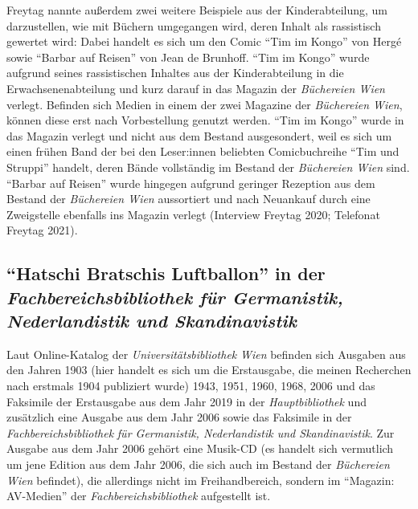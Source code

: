\documentclass[a4paper,
fontsize=11pt,
oneside,
numbers=noperiodatend,
parskip=half-,
bibliography=totoc,
final
]{scrartcl}
\begin{document}
Freytag nannte außerdem zwei weitere Beispiele aus der Kinderabteilung,
um darzustellen, wie mit Büchern umgegangen wird, deren Inhalt als
rassistisch gewertet wird: Dabei handelt es sich um den Comic \enquote{Tim im
Kongo} von Hergé sowie \enquote{Barbar auf Reisen} von Jean de Brunhoff.
\enquote{Tim im Kongo} wurde aufgrund seines rassistischen Inhaltes aus der
Kinderabteilung in die Erwachsenenabteilung und kurz darauf in das
Magazin der \emph{Büchereien Wien} verlegt. Befinden sich Medien in
einem der zwei Magazine der \emph{Büchereien Wien}, können diese erst
nach Vorbestellung genutzt werden. \enquote{Tim im Kongo} wurde in das Magazin
verlegt und nicht aus dem Bestand ausgesondert, weil es sich um einen
frühen Band der bei den Leser:innen beliebten Comicbuchreihe \enquote{Tim und
Struppi} handelt, deren Bände vollständig im Bestand der
\emph{Büchereien Wien} sind. \enquote{Barbar auf Reisen} wurde hingegen
aufgrund geringer Rezeption aus dem Bestand der \emph{Büchereien Wien}
aussortiert und nach Neuankauf durch eine Zweigstelle ebenfalls ins
Magazin verlegt (Interview Freytag 2020; Telefonat Freytag 2021).

\hypertarget{hatschi-bratschis-luftballon-in-der-fachbereichsbibliothek-fuxfcr-germanistik-nederlandistik-und-skandinavistik}{%
\subsection{\texorpdfstring{\enquote{Hatschi Bratschis Luftballon} in der
\emph{Fachbereichsbibliothek für Germanistik, Nederlandistik und
Skandinavistik}}{\enquote{Hatschi Bratschis Luftballon} in der Fachbereichsbibliothek für Germanistik, Nederlandistik und Skandinavistik}}\label{hatschi-bratschis-luftballon-in-der-fachbereichsbibliothek-fuxfcr-germanistik-nederlandistik-und-skandinavistik}}

Laut Online-Katalog der \emph{Universitätsbibliothek} \emph{Wien}
befinden sich Ausgaben aus den Jahren 1903 (hier handelt es sich um die
Erstausgabe, die meinen Recherchen nach erstmals 1904 publiziert wurde)
1943, 1951, 1960, 1968, 2006 und das Faksimile der Erstausgabe aus dem
Jahr 2019 in der \emph{Hauptbibliothek} und zusätzlich eine Ausgabe aus
dem Jahr 2006 sowie das Faksimile in der \emph{Fachbereichsbibliothek}
\emph{für Germanistik, Nederlandistik und Skandinavistik}. Zur Ausgabe
aus dem Jahr 2006 gehört eine Musik-CD (es handelt sich vermutlich um
jene Edition aus dem Jahr 2006, die sich auch im Bestand der
\emph{Büchereien Wien} befindet), die allerdings nicht im
Freihandbereich, sondern im \enquote{Magazin: AV-Medien} der
\emph{Fachbereichsbibliothek} aufgestellt ist.
\end{document}
